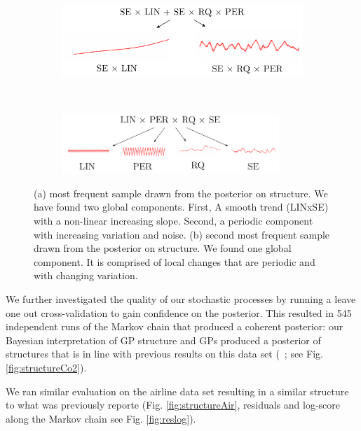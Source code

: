 \documentclass{article} %
\begin{document}
\begin{figure}
        \centering
        \begin{subfigure}[b]{\textwidth} \centering
                \includegraphics[width=\textwidth]{figs/airline_struct_1.pdf}\caption{}
        \end{subfigure}\\
	\begin{subfigure}[b]{\textwidth} \centering
                \includegraphics[width=0.9\textwidth]{figs/airline_struct_2.pdf}\caption{}
        \end{subfigure}%
        \caption{(a) most frequent sample drawn from the posterior on structure. We have found two global components. First, A smooth trend (LINxSE) with a non-linear increasing slope. Second, a periodic component with increasing variation and noise. (b) second most frequent sample drawn from the posterior on structure. We found one global component. It is comprised of local changes that are periodic and with changing variation.}\label{fig:posterior_twosamples}
\end{figure}
We further investigated the quality of our stochastic processes by running a leave one out cross-validation to gain confidence on the posterior. This resulted in 545 independent runs of the Markov chain that produced a coherent posterior: our Bayesian interpretation of GP structure and GPs produced a posterior of structures that is in line with previous results on this data set (~\citealp*{duvenaud2013structure}; see Fig. \ref{fig:structureCo2}).

We ran similar evaluation on the airline data set resulting in a similar structure to what was previously reporte (Fig. \ref{fig:structureAir}, residuals and log-score along the Markov chain see Fig. \ref{fig:reslog}).
\end{document}
